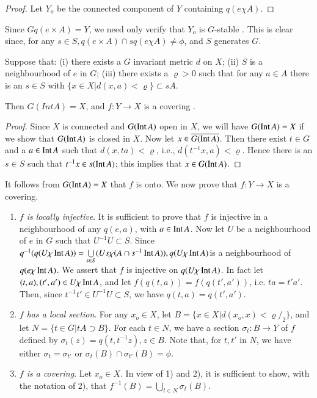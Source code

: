 \begin{proof}
  Let $Y_o$ be the connected component of $Y$ containing  $q(e \chi A)$. 
\end{proof}

Since $G q( e \times A)=Y$, we need only verify that $Y_o$ is
$G$-stable . This is clear since, for any $s \in  S,  q( e \times A)
\cap sq(e \chi  A) \neq \phi$, and $S$ generates $G$.    

\begin{lem}\label{chap4:lem2}%
  Suppose that: (i) there exists a $G$ invariant metric $d$ on $X$;
  (ii) $S$ is a neighbourhood of $e$ in $G$;  (iii) there exists a
  $\varrho > 0$ such that for any $a \in  A$ there is an $s \in S$ with
  $\bigg\{ x \in X | d(x,a) < \varrho \bigg\} \subset sA$.  
  
  Then $G(Int A)=X$, and $f: Y \to X$ is a covering . 
\end{lem}

\begin{proof}
  Since $X$ is connected and $G(\operatorname{Int} A)$ open in $X$, we will have
  $G(\operatorname{Int} A)=X$ if we show that $G(\operatorname{Int} A)$ is closed in $X$. Now let $x \in
  \overline{G(\operatorname{Int} A)}$. Then  there exist $t \in  G$ and a $a \in \operatorname{Int}
  A$ such that $d(x, ta)< \varrho$, i.e., $d(t^{-1} x,a)< \varrho$. Hence
  there is an $s \in S$ such that $t^{-1}x \in  s(\operatorname{Int} A)$; this implies
  that $x \in G(\operatorname{Int} A)$. 
\end{proof}

It follows from $G(\operatorname{Int} A)=X$ that $f$ is onto. We now prove that $f: Y
\to X$ is a covering. 
\begin{enumerate}
\item \textit{$f$ is locally injective}. It is sufficient to prove that
  $f$ is injective in a neighbourhood of any $q (e,a)$, with $a \in
  \operatorname{Int} A$. Now let $U$ be a neighbourhood of $e$ in $G$ such that
  $U^{-1} U \subset S$. Since $q^{-1}(q(U \chi \operatorname{Int}  A)) =
  \bigcup\limits_{s \in S} (Us \chi (A \cap s^{-1} \operatorname{Int} A)), q (U \chi
  \operatorname{Int} A)$\pageoriginale is a neighbourhood of $q(e \chi \operatorname{Int} A)$. We assert that $f$
  is injective on $q(U \chi\break \Int A)$. In fact let $(t,a),(t',a')\in U
  \chi \operatorname{Int} A$, and let $f(q(t,a))=f(q(t',a'))$, i.e. $ta =t'a'$. Then,
  since $t^{-1}t' \in U^{-1} U \subset S$, we have $q(t,a)= q(t',
  a')$. 
\item \textit{$f$ has a local section}. For any $x_o \in X$, let
  $B=\bigg\{ x \in X| d(x_o,x)< \varrho/_{2}  \bigg\}$, and let $N=
  \bigg\{t \in G \bigg | tA \supset B \bigg\}$. For each $t \in N$, we
  have a section  $\sigma_t :  B \to Y$ of $f$ defined by $\sigma_t(z)
  =q(t,t^{-1}z), z \in B$. Note that, for $t,t'$ in $N$, we have
  either $\sigma_t = \sigma_{t'}$ or $\sigma_t (B) \cap \sigma_{t'}(B)
  = \phi$. 
\item \textit{$f$ is a covering}. Let $x_o  \in X$. In view of 1)
  and 2), it is sufficient to show, with the notation  of 2), that
  $f^{-1}(B)= \bigcup\limits_{t \in N} \sigma_t (B)$. 
\end{enumerate}

